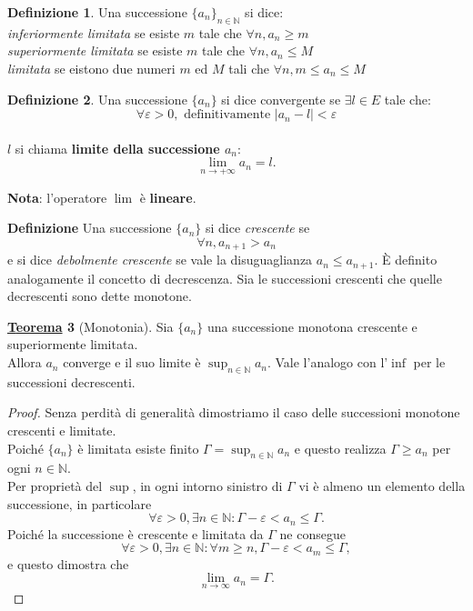 \documentclass[a4paper,twoside]{article}
\renewcommand{\epsilon}{\varepsilon}
\newcommand{\N}{\mathbb{N}}
\theoremstyle{definition}
\newtheorem{theorem}{\color{Red}\underline{\textrm Teorema}}
\newtheorem{definizione}[theorem]{Definizione}
\numberwithin{theorem}{section}
\begin{document}
\begin{definizione}
Una successione $\{a_n\}_{n\in\N}$ si dice: \\
\textit{inferiormente limitata} se  esiste $m$ tale che $\forall n, a_n\geq m$ \\
\textit{superiormente limitata} se  esiste $m$ tale che $\forall n, a_n\leq M$ \\
\textit{limitata} se eistono due numeri $m$ ed $M$ tali che $\forall n, m\leq a_n\leq M$
\end{definizione}

\begin{definizione}
Una successione $\{a_n\}$ si dice convergente se $\exists l\in E$ tale che: $$\forall \epsilon>0,\text{ definitivamente } |a_n-l|<\epsilon$$ \\
$l$ si chiama \textbf{limite della successione $a_n$}:
$$\lim_{n\to+\infty}a_n=l.$$
\end{definizione}

\textbf{Nota}: l'operatore $\lim$ è \textbf{lineare}.

\textbf{Definizione}
Una successione $\{a_n\}$ si dice \emph{crescente} se $$\forall n, a_{n+1} > a_n$$
 e si dice \emph{debolmente crescente} se vale la disuguaglianza $a_n\leq a_{n+1}$. È definito analogamente il concetto di decrescenza. Sia le successioni crescenti che quelle decrescenti sono dette monotone.\\
 
 
\begin{theorem}[Monotonia]
Sia $\{a_n\}$ una successione monotona crescente e superiormente limitata.\\ Allora $a_n$ converge e il suo limite è $\sup_{n\in\N} a_n$. Vale l'analogo con l'$\inf$ per le successioni decrescenti.
\end{theorem}
\begin{proof} Senza perdità di generalità dimostriamo il caso delle successioni monotone crescenti e limitate. \\
Poiché $\{a_n\}$ è limitata esiste finito $\Gamma=\sup_{n\in\N}a_n$ e questo realizza $\Gamma \geq a_n$ per ogni $n\in\N$.\\
Per proprietà del $\sup$, in ogni intorno sinistro di $\Gamma$ vi è almeno un elemento della successione, in particolare
$$ \forall \epsilon > 0, \exists n\in \N: \Gamma-\epsilon < a_n \leq \Gamma. $$
Poiché la successione è crescente e limitata da $\Gamma$ ne consegue
$$ \forall \epsilon > 0, \exists n\in \N: \forall m\geq n, \Gamma-\epsilon < a_m \leq \Gamma, $$
e questo dimostra che 
$$\lim_{n\to\infty}a_n = \Gamma.$$
\end{proof}
\end{document}
